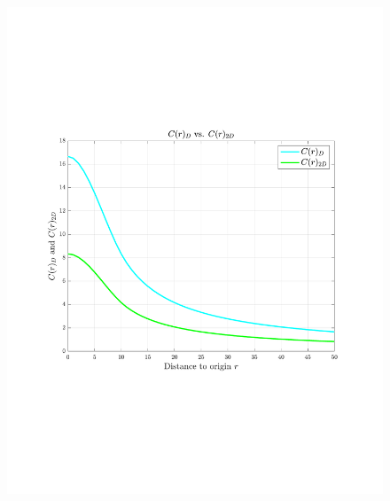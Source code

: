\documentclass[12pt,twoside]{article}
\begin{document}
\begin{figure}[H]
 \centering
 \includegraphics[scale=0.4]{concentration_d_2d}
\end{figure}

\ee
\end{document}
